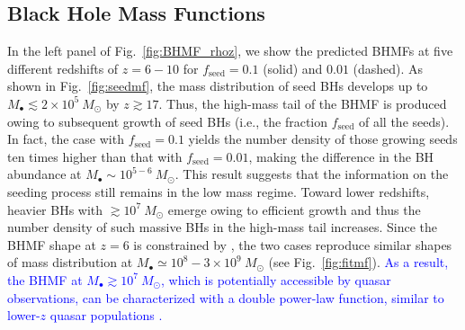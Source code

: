 \documentclass[twocolumn, twocolappendix]{aastex63}
\newcommand{\Msun}{M_\odot}
\newcommand{\fseed}{f_\mathrm{seed}}
\newcommand{\blue}[1]{\textcolor{blue}{ #1}}
\begin{document}
\begin{CJK*}{UTF8}{gbsn}
\subsection{Black Hole Mass Functions}


In the left panel of Fig.~\ref{fig:BHMF_rhoz}, we show the predicted BHMFs at five different redshifts of $z=6-10$
for $\fseed=0.1$ (solid) and $0.01$ (dashed).
As shown in Fig.~\ref{fig:seedmf}, the mass distribution of seed BHs develops up to $M_\bullet \lesssim 2\times10^5~\Msun$ by $z\gtrsim 17$.
Thus, the high-mass tail of the BHMF is produced owing to subsequent growth of seed BHs (i.e., the fraction $\fseed$ of all the seeds).
In fact, the case with $\fseed=0.1$ yields the number density of those growing seeds ten times higher than that with $\fseed =0.01$,
making the difference in the BH abundance at $M_\bullet \sim 10^{5-6}~\Msun$.
This result suggests that the information on the seeding process still remains in the low mass regime.
Toward lower redshifts, heavier BHs with $\gtrsim 10^7~\Msun$ emerge owing to efficient growth
and thus the number density of such massive BHs in the high-mass tail increases.
Since the BHMF shape at $z=6$ is constrained by ,
the two cases reproduce similar shapes of mass distribution at $M_\bullet \simeq 10^8-3\times 10^9~\Msun$ (see Fig.~\ref{fig:fitmf}).
\blue{As a result, the BHMF at $M_\bullet \gtrsim 10^7~\Msun$, which is potentially accessible by quasar observations,
can be characterized with a double power-law function, similar to lower-$z$ quasar populations \citep[e.g.,][]{2013ApJ...764...45K,2015MNRAS.447.2085S}.
}%
%





\end{CJK*}
\end{document}
